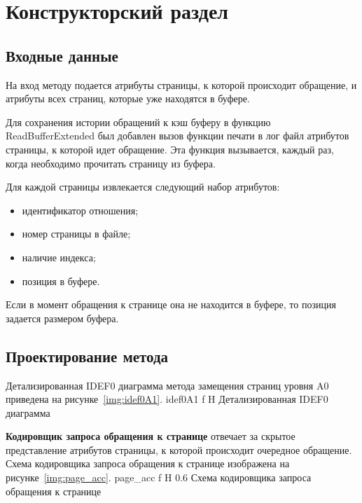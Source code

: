 \chapter{Конструкторский раздел}

\section{Входные данные}
На вход методу подается атрибуты страницы, к которой происходит обращение, и атрибуты всех страниц, которые уже находятся в буфере.

Для сохранения истории обращений к кэш буферу в функцию ReadBufferExtended был добавлен вызов функции печати в лог файл атрибутов страницы, к которой идет обращение.
Эта функция вызывается, каждый раз, когда необходимо прочитать страницу из буфера.

Для каждой страницы извлекается следующий набор атрибутов:
\begin{itemize}
	\item идентификатор отношения;
	\item номер страницы в файле;
	\item наличие индекса;
	\item позиция в буфере.
\end{itemize}

Если в момент обращения к странице она не находится в буфере, то позиция задается размером буфера.

\section{Проектирование метода}
Детализированная IDEF0 диаграмма метода замещения страниц уровня A0 приведена на рисунке~\ref{img:idef0A1}.
{idef0A1} %
{f} %
{H} %
{\textwidth} %
{Детализированная IDEF0 диаграмма} %

\textbf{Кодировщик запроса обращения к странице} отвечает за скрытое представление атрибутов страницы, к которой происходит очередное обращение.
Схема кодировщика запроса обращения к странице изображена на рисунке~\ref{img:page_acc}.
{page_acc} %
{f} %
{H} %
{0.6\textwidth} %
{Схема кодировщика запроса обращения к странице} %

